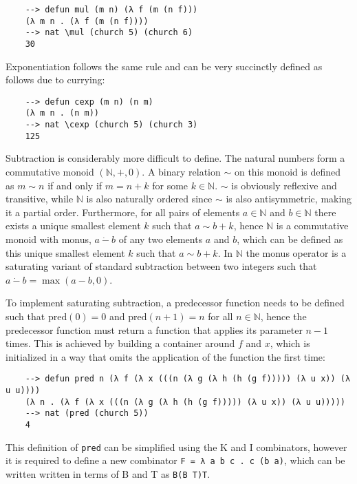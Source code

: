 \begin{Verbatim}
    --> defun mul (m n) (λ f (m (n f)))
    (λ m n . (λ f (m (n f))))
    --> nat \mul (church 5) (church 6)
    30
\end{Verbatim}

Exponentiation follows the same rule and can be very succinctly defined as follows due to currying:

\begin{Verbatim}
    --> defun cexp (m n) (n m)
    (λ m n . (n m))
    --> nat \cexp (church 5) (church 3)
    125
\end{Verbatim}

Subtraction is considerably more difficult to define. The natural numbers form a commutative monoid $(\mathbb{N}, +, 0)$. A binary relation $\sim$ on this monoid is defined as $m\sim n$ if and only if $m = n + k$ for some $k \in \mathbb{N}$. $\sim$ is obviously reflexive and transitive, while $\mathbb{N}$ is also naturally ordered since $\sim$ is also antisymmetric, making it a partial order. Furthermore, for all pairs of elements $a \in \mathbb{N}$ and $b \in \mathbb{N}$ there exists a unique smallest element $k$ such that $a \sim b + k$, hence $\mathbb{N}$ is a commutative monoid with monus, $a\ \dot -\ b$ of any two elements $a$ and $b$, which can be defined as this unique smallest element $k$ such that $a \sim b + k$. In $\mathbb{N}$ the monus operator is a saturating variant of standard subtraction between two integers such that $a\ \dot -\ b = \max(a - b, 0)$. 

To implement saturating subtraction, a predecessor function needs to be defined such that $\text{pred}(0) = 0$ and $\text{pred}(n + 1) = n$ for all $n \in \mathbb{N}$, hence the predecessor function must return a function that applies its parameter $n - 1$ times. This is achieved by building a container around $f$ and $x$, which is initialized in a way that omits the application of the function the first time:

\begin{Verbatim}
    --> defun pred n (λ f (λ x (((n (λ g (λ h (h (g f))))) (λ u x)) (λ u u))))
    (λ n . (λ f (λ x (((n (λ g (λ h (h (g f))))) (λ u x)) (λ u u)))))
    --> nat (pred (church 5))
    4
\end{Verbatim}

This definition of \verb|pred| can be simplified using the K and I combinators, however it is required to define a new combinator \verb|F = λ a b c . c (b a)|, which can be written written in terms of B and T as \verb|B(B T)T|.


